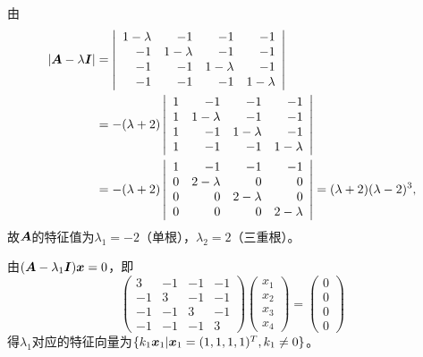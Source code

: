 \begin{frame}\ft{\secname}
\begin{jie}
  由
  $$
  \begin{aligned}
  |\boldsymbol{A}-\lambda\boldsymbol{I}|&=
  \left|
    \begin{array}{rrrr}
      1-\lambda&-1&-1&-1\\
      -1&1-\lambda&-1&-1\\
      -1&-1&1-\lambda&-1\\
      -1&-1&-1&1-\lambda
    \end{array}
  \right|\\
  &=-(\lambda+2)
  \left|
    \begin{array}{rrrr}
      1&-1&-1&-1\\
      1&1-\lambda&-1&-1\\
      1&-1&1-\lambda&-1\\
      1&-1&-1&1-\lambda
    \end{array}
  \right|\\
  &=-(\lambda+2)
  \left|
    \begin{array}{rrrr}
      1&-1&-1&-1\\
      0&2-\lambda&0&0\\
      0&0&2-\lambda&0\\
      0&0&0&2-\lambda
    \end{array}
  \right|=(\lambda+2)(\lambda-2)^3,
  \end{aligned}
  $$
  故$\boldsymbol{A}$的特征值为$\lambda_1=-2$（单根），$\lambda_2=2$（三重根）。

  由$(\boldsymbol{A}-\lambda_1\boldsymbol{I}){\boldsymbol{x}}=0$，即
  $$
  \left(
    \begin{array}{rrrr}
      3&-1&-1&-1\\
      -1&3&-1&-1\\
      -1&-1&3&-1\\
      -1&-1&-1&3
    \end{array}
  \right)
  \left(
    \begin{array}{c}
      x_1\\x_2\\x_3\\x_4
    \end{array}
  \right)=
  \left(
    \begin{array}{c}
      0\\0\\0\\0
    \end{array}
  \right)
  $$
  得$\lambda_1$对应的特征向量为$\{k_1{\boldsymbol{x}}_1|{\boldsymbol{x}}_1=(1,1,1,1)^T, k_1\ne 0\}$。


\end{jie}
\end{frame}
